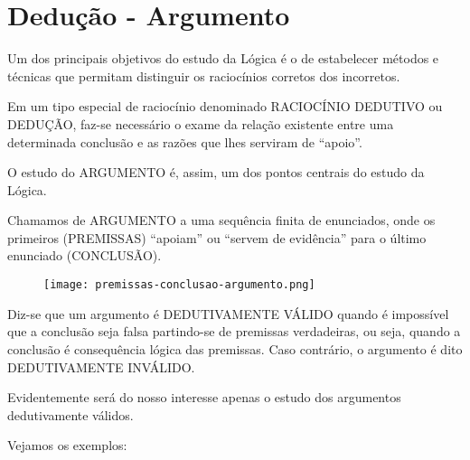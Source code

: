 \chapter{Dedução - Argumento}

Um dos principais objetivos do estudo da Lógica é o de estabelecer métodos e técnicas que permitam distinguir os raciocínios corretos dos incorretos.

Em um tipo especial de raciocínio denominado RACIOCÍNIO DEDUTIVO ou DEDUÇÃO, faz-se necessário o exame da relação existente entre uma determinada conclusão e as razões que lhes serviram de ``apoio''.

O estudo do ARGUMENTO é, assim, um dos pontos centrais do estudo da Lógica.

Chamamos de ARGUMENTO a uma sequência finita de enunciados, onde os primeiros (PREMISSAS) ``apoiam'' ou ``servem de evidência'' para o último enunciado (CONCLUSÃO).

\begin{comment}
    \begin{forest}
        for tree={
        grow=west,
        s sep=.1em,
        l sep=3em,
        sn edges
        }
        [Argumento
        [Premissas
        [$P_1$, tier=prem]
        [$\vdots$, tier=prem, no edge]
        [$P_{n-1}$, tier=prem]
        ]
        [Conclusão
        [$P_n$, tier=prem, edge={<-}]
        ]
        ]
        \draw (-8.1,-0.7) -- (-7,-0.7);
        \end{forest}
\end{comment}

\begin{figure}[H]
	\begin{center}
	    \texttt{[image: premissas-conclusao-argumento.png]}
	\end{center}
\end{figure}

Diz-se que um argumento é DEDUTIVAMENTE VÁLIDO quando é impossível que a conclusão seja falsa partindo-se de premissas verdadeiras, ou seja, quando a conclusão é consequência lógica das premissas.
Caso contrário, o argumento é dito DEDUTIVAMENTE INVÁLIDO.

Evidentemente será do nosso interesse apenas o estudo dos argumentos dedutivamente válidos.

Vejamos os exemplos:

